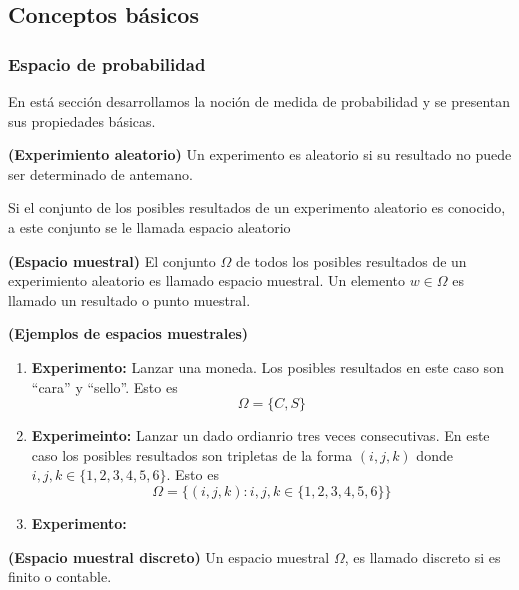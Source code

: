 \subsection{Conceptos b\'asicos}
\subsubsection{Espacio de probabilidad}

En est\'a secci\'on desarrollamos la noci\'on de medida de probabilidad y se presentan sus propiedades b\'asicas.

\begin{definition}{\bf (Experimiento aleatorio)}
Un experimento es aleatorio si su resultado no puede ser determinado de antemano.
\end{definition}

Si el conjunto de los posibles resultados de un experimento aleatorio es conocido, a este conjunto se le llamada espacio aleatorio

\begin{definition}{\bf (Espacio muestral)}
    El conjunto $\Omega$ de todos los posibles resultados de un experimiento aleatorio es llamado espacio muestral. Un elemento $w\in \Omega$ es llamado 
    un resultado o punto muestral.
\end{definition}

\begin{example}{\bf (Ejemplos de espacios muestrales)}
    \hspace{1cm}
    \begin{enumerate}[{\bf 1.}]
    \item {\bf Experimento:} Lanzar una moneda. Los posibles resultados en este caso son ``cara'' y ``sello''. Esto es 
    $$\Omega = \{ C,S \}$$
    \item {\bf Experimeinto:} Lanzar un dado ordianrio tres veces consecutivas. En este caso los posibles resultados son tripletas de la forma
    $(i,j,k)$ donde $i,j,k\in \{1,2,3,4,5,6\}$. Esto es
    $$\Omega = \{ (i,j,k) : i,j,k\in \{1,2,3,4,5,6\} \}$$
    \item {\bf Experimento:}  
    \end{enumerate}
\end{example}

\begin{definition}{\bf (Espacio muestral discreto)}
    Un espacio muestral $\Omega$, es llamado discreto si es finito o contable.
\end{definition}


